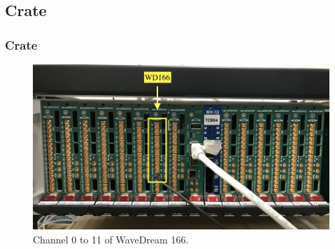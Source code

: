 \documentclass[9pt]{beamer}
\begin{document}
\subsection{Crate}
\begin{frame} [fragile]
\small
	\frametitle{Crate}
    		\begin{figure}
		 \centering
			\includegraphics[scale=0.3]{photos/im2.png}
			\caption{Channel 0 to 11 of WaveDream 166.}
		\end{figure}  
\end{frame}
\end{document}
